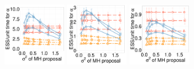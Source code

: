   \begin{figure}[H]
  \centering
  \begin{minipage}[h!]{0.99\linewidth}
    \includegraphics [width=0.24\textwidth, angle=0]{figs/new_whole_exp_figs/q_alpha_dim3.pdf}
	\hspace{.6in}
    \includegraphics [width=0.24\textwidth, angle=0]{figs/new_whole_exp_figs/q_alpha_dim5.pdf}
	\hspace{.6in}
    \includegraphics [width=0.24\textwidth, angle=0]{figs/new_whole_exp_figs/q_alpha_dim10.pdf}
  \end{minipage}


\end{figure}
